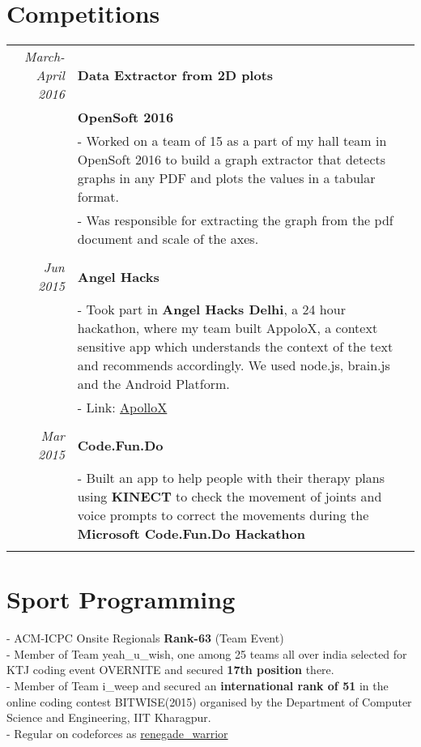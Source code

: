 \documentclass[a4paper,10pt]{article} %
\begin{document}
\section{Competitions}

\begin{tabular}{r|p{15cm}}


\emph{March-April 2016} & \textbf{Data Extractor from 2D plots} \\
& \textbf{OpenSoft 2016}\\
& \footnotesize{- Worked on a team of 15 as a part of my hall team in OpenSoft 2016 to build a graph extractor that detects graphs in any PDF and plots the values in a tabular format.}\\
& \footnotesize{- Was responsible for extracting the graph from the pdf document and scale of the axes.}\\
\multicolumn{2}{c}{} \\

\emph{Jun 2015} & \textbf{Angel Hacks} \\
& \footnotesize{- Took part in \textbf{Angel Hacks Delhi}, a 24 hour hackathon, where my team built AppoloX, a context sensitive app which understands the context of the text and recommends accordingly. We used node.js, brain.js and the Android Platform. }\\
& \footnotesize{- Link: \href{http://52.11.170.180:8080/}{ApolloX}}\\
\multicolumn{2}{c}{} \\

\emph{Mar 2015} & \textbf{Code.Fun.Do} \\
& \footnotesize{- Built an app to help people with their therapy plans using \textbf{KINECT} to check the movement of joints and voice prompts to correct the movements during the \textbf{Microsoft Code.Fun.Do Hackathon}}\\
\multicolumn{2}{c}{} \\
\end{tabular}


\section{Sport Programming}

- ACM-ICPC Onsite Regionals \textbf{Rank-63} (Team Event)\\
- Member of Team yeah\_u\_wish, one among 25 teams all over india selected for KTJ coding event OVERNITE and secured \textbf{17th position} there.\\
- Member of Team i\_weep and secured an \textbf{international rank of 51} in the online coding contest BITWISE(2015) organised by the Department of Computer Science and Engineering, IIT Kharagpur.\\
- Regular on codeforces as {\href{http://codeforces.com/profile/renegade_warrior}{renegade\_warrior}}\\
\end{document}
